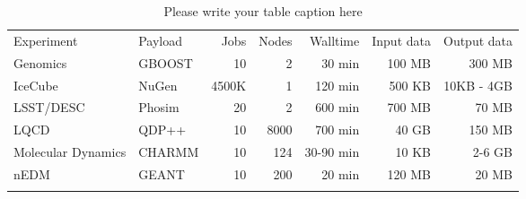 \begin{table}
\caption{Please write your table caption here}
\label{tab:beyondhep}       %
\begin{tabular}{llrrrrr}
\hline\noalign{\smallskip}
Experiment & Payload & Jobs & Nodes & Walltime & Input data & Output data \\
\noalign{\smallskip}\hline\noalign{\smallskip}
Genomics           & GBOOST & 10    & 2    & 30 min    & 100 MB & 300 MB \\
IceCube            & NuGen  & 4500K & 1    & 120 min   & 500 KB & 10KB - 4GB \\
LSST/DESC          & Phosim & 20    & 2    & 600 min   & 700 MB & 70 MB \\
LQCD               & QDP++  & 10    & 8000 & 700 min   & 40 GB  & 150 MB \\
Molecular Dynamics & CHARMM & 10    & 124  & 30-90 min & 10 KB  & 2-6 GB \\
nEDM               & GEANT  & 10    & 200  & 20 min    & 120 MB & 20 MB \\
\noalign{\smallskip}\hline
\end{tabular}
\end{table}


